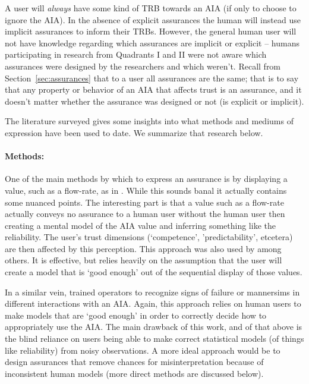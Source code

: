     A user will \emph{always} have some kind of TRB towards an AIA (if only to choose to ignore the AIA). In the absence of explicit assurances the human will instead use implicit assurances to inform their TRBs. However, the general human user will not have knowledge regarding which assurances are implicit or explicit -- humans participating in research from Quadrants I and II were not aware which assurances were designed by the researchers and which weren't. Recall from Section~\ref{sec:assurances} that to a user all assurances are the same; that is to say that any property or behavior of an AIA that affects trust is an assurance, and it doesn't matter whether the assurance was designed or not (is explicit or implicit).

    The literature surveyed gives some insights into what methods and mediums of expression have been used to date. We summarize that research below.

    \paragraph{Methods:} One of the main methods by which to express an assurance is by displaying a value, such as a flow-rate, as in \cite{Muir1996-gt}. While this sounds banal it actually contains some nuanced points. The interesting part is that a value such as a flow-rate actually conveys no assurance to a human user without the human user then creating a mental model of the AIA value and inferring something like the reliability. The user's trust dimensions (`competence', 'predictability', etcetera) are then affected by this perception. This approach was also used by \cite{Wickens1999-la,Sheridan1984-kx,Hutchins2015-if} among others. It is effective, but relies heavily on the assumption that the user will create a model that is `good enough' out of the sequential display of those values.

    In a similar vein, \cite{Freedy2007-sg,Desai2012-rc,Salem2015-md} trained operators to recognize signs of failure or mannersims in different interactions with an AIA. Again, this approach relies on human users to make models that are `good enough' in order to correctly decide how to appropriately use the AIA. The main drawback of this work, and of that above is the blind reliance on users being able to make correct statistical models (of things like reliability) from noisy observations. A more ideal approach would be to design assurances that remove chances for misinterpretation because of inconsistent human models (more direct methods are discussed below).

